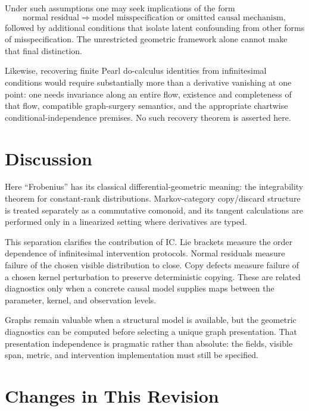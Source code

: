 \documentclass{article}
\theoremstyle{plain}
\theoremstyle{definition}
\theoremstyle{remark}
\newcommand{\IC}{\textsc{IC}}
\begin{document}
Under such assumptions one may seek implications of the form
\[
 \text{normal residual}
 \Longrightarrow
 \text{model misspecification or omitted causal mechanism},
\]
followed by additional conditions that isolate latent confounding from other
forms of misspecification.  The unrestricted geometric framework alone cannot
make that final distinction.

Likewise, recovering finite Pearl do-calculus identities from infinitesimal
conditions would require substantially more than a derivative vanishing at one
point: one needs invariance along an entire flow, existence and completeness of
that flow, compatible graph-surgery semantics, and the appropriate chartwise
conditional-independence premises.  No such recovery theorem is asserted here.

\section{Discussion}

Here ``Frobenius'' has its classical differential-geometric meaning: the
integrability theorem for
constant-rank distributions.  Markov-category copy/discard structure is treated
separately as a commutative comonoid, and its tangent calculations are performed
only in a linearized setting where derivatives are typed.

This separation clarifies the contribution of \IC.  Lie brackets measure the order
dependence of infinitesimal intervention protocols.  Normal residuals measure
failure of the chosen visible distribution to close.  Copy defects measure
failure of a chosen kernel perturbation to preserve deterministic copying.
These are related diagnostics only when a concrete causal model supplies maps
between the parameter, kernel, and observation levels.

Graphs remain valuable when a structural model is available, but the geometric
diagnostics can be computed before selecting a unique graph presentation.  That
presentation independence is pragmatic rather than absolute: the fields,
visible span, metric, and intervention implementation must still be specified.

\section{Changes in This Revision}
\label{sec:changes}
\end{document}
